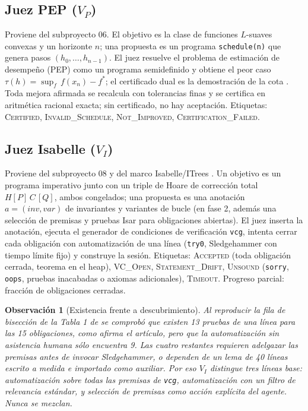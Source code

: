 \documentclass[11pt,a4paper]{article}
\newtheorem{remark}{Observación}
\begin{document}
\subsection{Juez PEP ($V_P$)}

Proviene del subproyecto 06. El objetivo es la clase de funciones $L$-suaves convexas y un horizonte $n$; una propuesta es un programa \texttt{schedule(n)} que genera pasos $(h_0,\dots,h_{n-1})$. El juez resuelve el problema de estimación de desempeño (PEP) como un programa semidefinido y obtiene el peor caso $\tau(h) = \sup_f\, f(x_n) - f^*$; el certificado dual es la demostración de la cota \citep{DroriTeboulle2014,TaylorHendrickxGlineur2017}. Toda mejora afirmada se recalcula con tolerancias finas y se certifica en aritmética racional exacta; sin certificado, no hay aceptación. Etiquetas: \textsc{Certified}, \textsc{Invalid\_Schedule}, \textsc{Not\_Improved}, \textsc{Certification\_Failed}.

\subsection{Juez Isabelle ($V_I$)}

Proviene del subproyecto 08 y del marco Isabelle/ITrees \citep{BryantHuertaFoster2026}. Un objetivo es un programa imperativo junto con un triple de Hoare de corrección total $H[P]\,C\,[Q]$, ambos congelados; una propuesta es una anotación $a = (\mathit{inv}, \mathit{var})$ de invariantes y variantes de bucle (en fase 2, además una selección de premisas y pruebas Isar para obligaciones abiertas). El juez inserta la anotación, ejecuta el generador de condiciones de verificación \texttt{vcg}, intenta cerrar cada obligación con automatización de una línea (\texttt{try0}, Sledgehammer con tiempo límite fijo) y construye la sesión. Etiquetas: \textsc{Accepted} (toda obligación cerrada, teorema en el heap), \textsc{VC\_Open}, \textsc{Statement\_Drift}, \textsc{Unsound} (\texttt{sorry}, \texttt{oops}, pruebas inacabadas o axiomas adicionales), \textsc{Timeout}. Progreso parcial: fracción de obligaciones cerradas.

\begin{remark}[Existencia frente a descubrimiento]
Al reproducir la fila de bisección de la Tabla 1 de \citet{BryantHuertaFoster2026} se comprobó que existen 13 pruebas de una línea para las 15 obligaciones, como afirma el artículo, pero que la automatización sin asistencia humana sólo encuentra 9. Las cuatro restantes requieren adelgazar las premisas antes de invocar Sledgehammer, o dependen de un lema de 40 líneas escrito a medida e importado como auxiliar. Por eso $V_I$ distingue tres líneas base: automatización sobre todas las premisas de \texttt{vcg}, automatización con un filtro de relevancia estándar, y selección de premisas como acción explícita del agente. Nunca se mezclan.
\end{remark}
\end{document}

